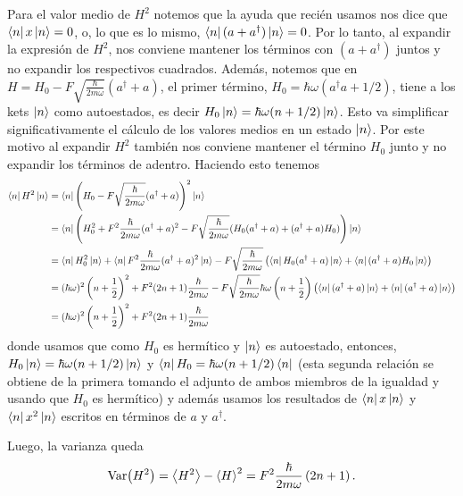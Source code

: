\documentclass[10pt, a4paper]{article}
\newcommand{\xprefactsq}{\frac{\hbar}{2m\omega}}
\newcommand{\xprefact}{\sqrt{\xprefactsq}}
\numberwithin{equation}{subsection}
\begin{document}
Para el valor medio de $H^2$ notemos que la ayuda que recién usamos nos dice
que $\bra{n}x\ket{n} = 0$, o, lo que es lo mismo, $\bra{n}(a + a^\dagger)
\ket{n} = 0$. Por lo tanto, al expandir la expresión de $H^2$, nos conviene
mantener los términos con $(a + a^\dagger)$ juntos y no expandir los
respectivos cuadrados. Además, notemos que en $H = H_0 - F \xprefact
\left(a^\dagger + a\right)$, el primer término, $H_0 = \hbar\omega(a^\dagger a
+ 1/2)$, tiene a los kets $\ket{n}$ como autoestados, es decir $H_0\ket{n} =
\hbar\omega(n + 1/2)\ket{n}$. Esto va simplificar significativamente el cálculo
de los valores medios en un estado $\ket{n}$. Por este motivo al expandir $H^2$
también nos conviene mantener el término $H_0$ junto y no expandir los términos
de adentro. Haciendo esto tenemos
\begin{align}
  \bra{n}H^2\ket{n} &= \bra{n}\left(H_0 - F \xprefact (a^\dagger + a)\right)^2
    \ket{n} \\
  &= \bra{n}\left(H_0^2 + F^2\xprefactsq(a^\dagger + a)^2 - F\xprefact
    (H_0(a^\dagger + a) + (a^\dagger + a)H_0)\right)\ket{n} \\
  &= \bra{n}H_0^2\ket{n} + \bra{n}F^2\xprefactsq (a^\dagger + a)^2\ket{n} - F
    \xprefact \left(\bra{n}H_0(a^\dagger + a)\ket{n} + \bra{n}
    (a^\dagger + a)H_0\ket{n}\right) \\
  &= (\hbar\omega)^2\left(n + \frac{1}{2}\right)^2 + F^2(2n + 1)
    \xprefactsq - F\xprefact\hbar\omega\left(n + \frac{1}{2}\right)\left(
    \bra{n}(a^\dagger + a)\ket{n} + \bra{n}(a^\dagger + a)\ket{n}\right) \\
  &= (\hbar\omega)^2\left(n + \frac{1}{2}\right)^2 + F^2(2n + 1)
    \frac{\hbar}{2m\omega}
\end{align}
donde usamos que como $H_0$ es hermítico y $\ket{n}$ es autoestado, entonces,
$H_0\ket{n} = \hbar\omega(n + 1/2)\ket{n}$ y $\bra{n}H_0 = \hbar\omega(n +
1/2)\bra{n}$ (esta segunda relación se obtiene de la primera tomando el adjunto
de ambos miembros de la igualdad y usando que $H_0$ es hermítico) y además
usamos los resultados de $\bra{n}x\ket{n}$ y $\bra{n}x^2\ket{n}$ escritos en
términos de $a$ y $a^\dagger$.

Luego, la varianza queda
\begin{equation}
  \Var(H^2) = \expval{H^2} - \expval{H}^2 = F^2\xprefactsq\left(2n + 1\right).
\end{equation}

\bigbreak
\end{document}
